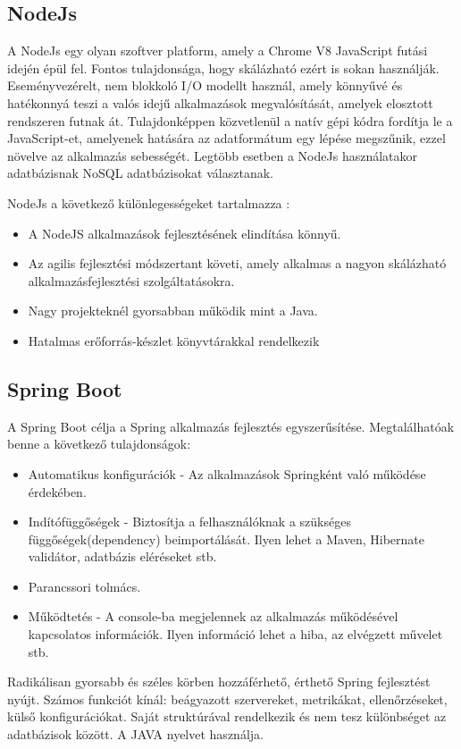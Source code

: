 \subsection{NodeJs}
A NodeJs \cite{js2016node} egy olyan szoftver platform, amely a Chrome V8 JavaScript futási idején épül fel. Fontos tulajdonsága, hogy skálázható ezért is sokan használják. Eseményvezérelt, nem blokkoló I/O modellt használ, amely könnyűvé és hatékonnyá teszi a valós idejű alkalmazások megvalósítását, amelyek elosztott rendszeren futnak át. Tulajdonképpen közvetlenül a natív gépi kódra fordítja le a JavaScript-et, amelyenek hatására az adatformátum egy lépése megszűnik, ezzel növelve az alkalmazás sebességét. Legtöbb esetben a NodeJs használatakor adatbázisnak NoSQL adatbázisokat választanak.

NodeJs a következő különlegességeket tartalmazza \cite{nodejsspring}:
\begin{itemize}
	\item A NodeJS alkalmazások fejlesztésének elindítása könnyű.
	\item Az agilis fejlesztési módszertant követi, amely alkalmas a nagyon skálázható alkalmazásfejlesztési szolgáltatásokra.
	\item Nagy projekteknél gyorsabban működik mint a Java.
	\item Hatalmas erőforrás-készlet könyvtárakkal rendelkezik
\end{itemize}
	
\subsection{Spring Boot}
A Spring Boot \cite{jovanovic2017java} célja a Spring alkalmazás fejlesztés egyszerűsítése. Megtalálhatóak benne a következő tulajdonságok:
\begin{itemize}
	\item Automatikus konfigurációk - Az alkalmazások Springként való működése érdekében.
	\item Indítófüggőségek - Biztosítja a felhasználóknak a szükséges függőségek(dependency) beimportálását. Ilyen lehet a Maven, Hibernate validátor, adatbázis eléréseket stb.
	\item Parancssori tolmács.
	\item Működtetés - A console-ba megjelennek az alkalmazás működésével kapcsolatos információk. Ilyen információ lehet a hiba, az elvégzett művelet stb.
\end{itemize}
	
Radikálisan gyorsabb és széles körben hozzáférhető, érthető Spring fejlesztést nyújt. Számos funkciót kínál: beágyazott szervereket, metrikákat, ellenőrzéseket, külső konfigurációkat. Saját struktúrával rendelkezik és nem tesz különbséget az adatbázisok között. A JAVA nyelvet használja.

